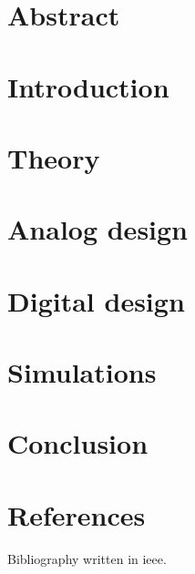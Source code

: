 \documentclass[a4paper, 12pt, english]{article}
\begin{document}
\newpage
\section{Abstract} \label{sec:Abstract}


\section{Introduction} \label{sec:Introduction}


\newpage
\section{Theory} \label{sec:Theory}


\newpage
\section{Analog design} \label{sec:AnalogDesign}


\newpage
\section{Digital design} \label{sec:DigitalDesign}


\newpage
\section{Simulations} \label{sec:Simulations}


\newpage
\section{Conclusion} \label{sec:Conclusion}


\newpage
\section{References} \label{sec:References}

Bibliography written in ieee.

\printbibliography
\end{document}
